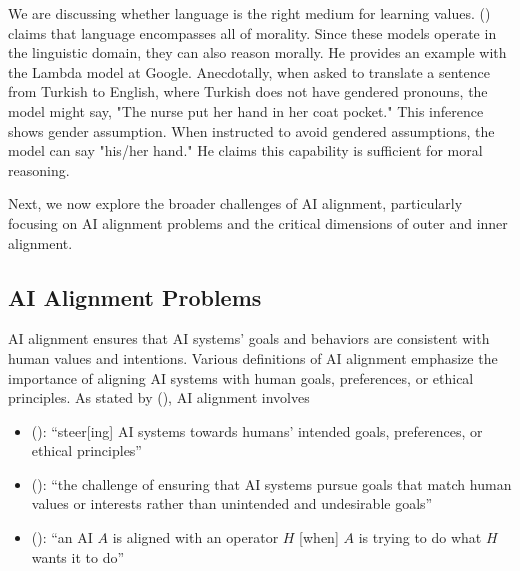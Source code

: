 \documentclass[
  letterpaper,
  numbers=noenddot,
  DIV=11,
  oneside]{scrreprt}
\theoremstyle{remark}
\begin{document}
We are discussing whether language is the right medium for learning
values. () claims that language
encompasses all of morality. Since these models operate in the
linguistic domain, they can also reason morally. He provides an example
with the Lambda model at Google. Anecdotally, when asked to translate a
sentence from Turkish to English, where Turkish does not have gendered
pronouns, the model might say, "The nurse put her hand in her coat
pocket." This inference shows gender assumption. When instructed to
avoid gendered assumptions, the model can say "his/her hand." He claims
this capability is sufficient for moral reasoning.

Next, we now explore the broader challenges of AI alignment,
particularly focusing on AI alignment problems and the critical
dimensions of outer and inner alignment.

\subsection{AI Alignment Problems}\label{ai-alignment-problems}

AI alignment ensures that AI systems' goals and behaviors are consistent
with human values and intentions. Various definitions of AI alignment
emphasize the importance of aligning AI systems with human goals,
preferences, or ethical principles. As stated by
(), AI
alignment involves

\begin{itemize}
\item
  ():
  ``steer{[}ing{]} AI systems towards humans' intended goals,
  preferences, or ethical principles''
\item
  ():
  ``the challenge of ensuring that AI systems pursue goals that match
  human values or interests rather than unintended and undesirable
  goals''
\item
  (): ``an AI
  \(A\) is aligned with an operator \(H\) {[}when{]} \(A\) is trying to
  do what \(H\) wants it to do''
\end{itemize}
\end{document}
